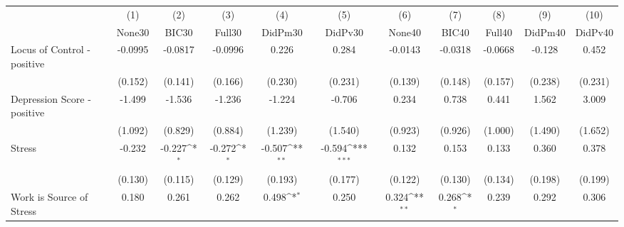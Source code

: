 {
\def\sym#1{\ifmmode^{#1}\else\(^{#1}\)\fi}
\begin{tabular}{l*{10}{c}}
\toprule
            &\multicolumn{1}{c}{(1)}&\multicolumn{1}{c}{(2)}&\multicolumn{1}{c}{(3)}&\multicolumn{1}{c}{(4)}&\multicolumn{1}{c}{(5)}&\multicolumn{1}{c}{(6)}&\multicolumn{1}{c}{(7)}&\multicolumn{1}{c}{(8)}&\multicolumn{1}{c}{(9)}&\multicolumn{1}{c}{(10)}\\
            &\multicolumn{1}{c}{None30}&\multicolumn{1}{c}{BIC30}&\multicolumn{1}{c}{Full30}&\multicolumn{1}{c}{DidPm30}&\multicolumn{1}{c}{DidPv30}&\multicolumn{1}{c}{None40}&\multicolumn{1}{c}{BIC40}&\multicolumn{1}{c}{Full40}&\multicolumn{1}{c}{DidPm40}&\multicolumn{1}{c}{DidPv40}\\
\midrule
Locus of Control - positive&     -0.0995         &     -0.0817         &     -0.0996         &       0.226         &       0.284         &     -0.0143         &     -0.0318         &     -0.0668         &      -0.128         &       0.452         \\
            &     (0.152)         &     (0.141)         &     (0.166)         &     (0.230)         &     (0.231)         &     (0.139)         &     (0.148)         &     (0.157)         &     (0.238)         &     (0.231)         \\
\addlinespace
Depression Score - positive&      -1.499         &      -1.536         &      -1.236         &      -1.224         &      -0.706         &       0.234         &       0.738         &       0.441         &       1.562         &       3.009         \\
            &     (1.092)         &     (0.829)         &     (0.884)         &     (1.239)         &     (1.540)         &     (0.923)         &     (0.926)         &     (1.000)         &     (1.490)         &     (1.652)         \\
\addlinespace
Stress      &      -0.232         &      -0.227\sym{*}  &      -0.272\sym{*}  &      -0.507\sym{**} &      -0.594\sym{***}&       0.132         &       0.153         &       0.133         &       0.360         &       0.378         \\
            &     (0.130)         &     (0.115)         &     (0.129)         &     (0.193)         &     (0.177)         &     (0.122)         &     (0.130)         &     (0.134)         &     (0.198)         &     (0.199)         \\
\addlinespace
Work is Source of Stress&       0.180         &       0.261         &       0.262         &       0.498\sym{*}  &       0.250         &       0.324\sym{**} &       0.268\sym{*}  &       0.239         &       0.292         &       0.306         \\

\end{tabular}}
